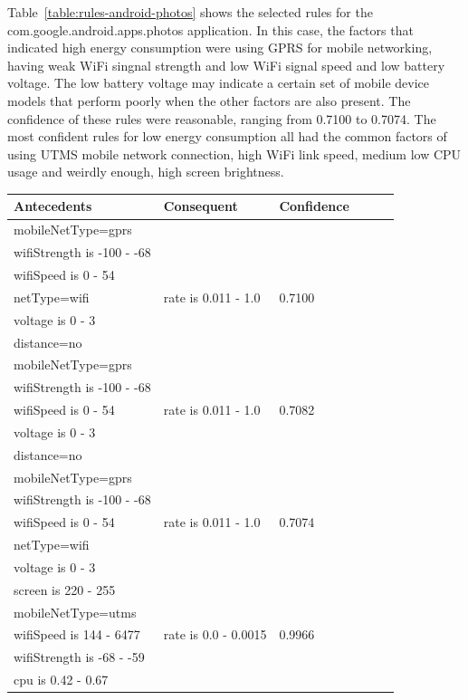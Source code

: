 Table~\ref{table:rules-android-photos} shows the selected rules for the com.google.android.apps.photos application. In this case, the factors that indicated high energy consumption were using GPRS for mobile networking, having weak WiFi singnal strength and low WiFi signal speed and low battery voltage. The low battery voltage may indicate a certain set of mobile device models that perform poorly when the other factors are also present. The confidence of these rules were reasonable, ranging from 0.7100 to 0.7074. The most confident rules for low energy consumption all had the common factors of using UTMS mobile network connection, high WiFi link speed, medium low CPU usage and weirdly enough, high screen brightness. 

\begin{table} \small%
\begin{tabular}{|p{5.0cm}|p{3.0cm}|p{2.0cm}|p{1.5cm}|p{0.3cm}| p{0.3cm}|}
\hline
Antecedents & Consequent & Confidence \\
\hline
	mobileNetType=gprs				& & \\
	wifiStrength is -100 - -68		& & \\
	wifiSpeed is 0 - 54				& & \\
	netType=wifi					& rate is 0.011 - 1.0 & 0.7100 \\
	voltage is 0 - 3				& & \\
	distance=no						& & \\
\hline
	mobileNetType=gprs				& & \\
	wifiStrength is -100 - -68		& & \\
	wifiSpeed is 0 - 54				&  rate is 0.011 - 1.0 & 0.7082 \\
	voltage is 0 - 3				& & \\
	distance=no						& & \\
\hline
	mobileNetType=gprs				& & \\
	wifiStrength is -100 - -68		& & \\
	wifiSpeed is 0 - 54				& rate is 0.011 - 1.0 & 0.7074 \\
	netType=wifi					& & \\
	voltage is 0 - 3				& & \\
\hline
	screen is 220 - 255				& & \\
	mobileNetType=utms				& & \\
	wifiSpeed is 144 - 6477		& rate is 0.0 - 0.0015 & 0.9966 \\
	wifiStrength is -68 - -59		& & \\
	cpu is 0.42 - 0.67				& & \\

\end{tabular}
\end{table}
